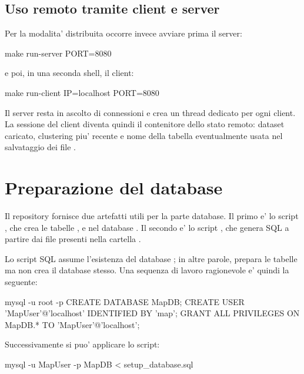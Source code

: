 \subsection{Uso remoto tramite client e server}

Per la modalita' distribuita occorre invece avviare prima il server:

\begin{commandblock}
  make run-server PORT=8080
\end{commandblock}

e poi, in una seconda shell, il client:

\begin{commandblock}
  make run-client IP=localhost PORT=8080
\end{commandblock}

Il server resta in ascolto di connessioni e crea un thread dedicato per ogni client. La
sessione del client diventa quindi il contenitore dello stato remoto: dataset caricato,
clustering piu' recente e nome della tabella eventualmente usata nel salvataggio dei file
.

\section{Preparazione del database}

Il repository fornisce due artefatti utili per la parte database. Il primo e' lo script
, che crea le tabelle ,
 e  nel database . Il secondo e' lo
script , che genera  SQL a partire dai file
presenti nella cartella .

Lo script SQL assume l'esistenza del database ; in altre parole, prepara le
tabelle ma non crea il database stesso. Una sequenza di lavoro ragionevole e' quindi la seguente:

\begin{commandblock}
  mysql -u root -p
  CREATE DATABASE MapDB;
  CREATE USER 'MapUser'@'localhost' IDENTIFIED BY 'map';
  GRANT ALL PRIVILEGES ON MapDB.* TO 'MapUser'@'localhost';
\end{commandblock}

Successivamente si puo' applicare lo script:

\begin{commandblock}
  mysql -u MapUser -p MapDB < setup_database.sql
\end{commandblock}

